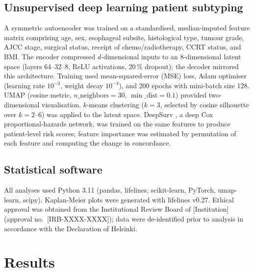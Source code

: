 \documentclass[12pt,a4paper]{article}
\begin{document}
\subsection{Unsupervised deep learning patient subtyping}
A symmetric autoencoder was trained on a standardised, median-imputed
feature matrix comprising age, sex, esophageal subsite, histological
type, tumour grade, AJCC stage, surgical status, receipt of
chemo/radiotherapy, CCRT status, and BMI. The encoder compressed
$d$-dimensional inputs to an 8-dimensional latent space (layers 64--32--8,
ReLU activations, 20\,\% dropout); the decoder mirrored this architecture.
Training used mean-squared-error (MSE) loss, Adam optimiser
(learning rate $10^{-3}$, weight decay $10^{-4}$), and 200 epochs with
mini-batch size 128. UMAP (cosine metric, $n\_\text{neighbors} = 30$,
$\min\_\text{dist} = 0.1$) provided two-dimensional visualisation.
$k$-means clustering ($k = 3$, selected by cosine silhouette over
$k = 2$--6) was applied to the latent space. DeepSurv \cite{Katzman2018},
a deep Cox proportional-hazards network, was trained on the same features
to produce patient-level risk scores; feature importance was estimated by
permutation of each feature and computing the change in concordance.

\subsection{Statistical software}
All analyses used Python 3.11 (pandas, lifelines, scikit-learn, PyTorch,
umap-learn, scipy). Kaplan-Meier plots were generated with lifelines v0.27.
Ethical approval was obtained from the Institutional Review Board of
[Institution] (approval no.\ [IRB-XXXX-XXXX]); data were de-identified
prior to analysis in accordance with the Declaration of Helsinki.

\section{Results}
\end{document}
